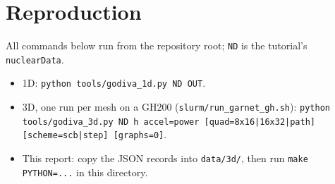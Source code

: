 \documentclass[a4paper,10pt]{article}
\newcommand{\code}[1]{\texttt{#1}}
\begin{document}
\section{Reproduction}

All commands below run from the repository root; \code{ND} is the tutorial's
\code{nuclearData}.
\begin{itemize}
\item 1D: \code{python tools/godiva\_1d.py ND OUT}.
\item 3D, one run per mesh on a GH200 (\code{slurm/run\_garnet\_gh.sh}):
  \code{python tools/godiva\_3d.py ND h accel=power [quad=8x16|16x32|path]
  [scheme=scb|step] [graphs=0]}.
\item This report: copy the JSON records into \code{data/3d/}, then run
  \code{make PYTHON=...} in this directory.
\end{itemize}
\end{document}
